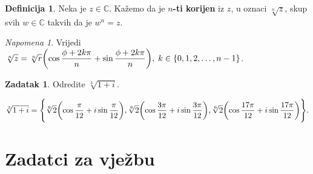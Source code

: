 \documentclass{book}
\let\originalleft\left
\let\originalright\right
\renewcommand{\left}{\mathopen{}\mathclose\bgroup\originalleft}
\renewcommand{\right}{\aftergroup\egroup\originalright}
\renewenvironment{proof}{%
    \vspace{-\parskip}\begin{oldproof}%
    }{%
    \end{oldproof}%
}
\theoremstyle{definition}
\theoremstyle{definition}
\newtheorem{definition}{Definicija}
\newtheorem{exercise}{Zadatak}
\theoremstyle{remark}
\newtheorem{remark}{Napomena}
\begin{document}
\begin{definition}
Neka je $z\in \mathbb{C}$. Kažemo da je \textbf{$n$-ti korijen} iz $z$, u oznaci $\sqrt[n]{z}$, skup svih $w\in \mathbb{C}$ takvih da je $w^n=z$.
\end{definition}

\begin{remark}
Vrijedi $\sqrt[n]{z}=\sqrt[n]{r}\left(\cos{\dfrac{\phi+2k\pi}{n}}+\sin{\dfrac{\phi+2k\pi}{n}}\right), \; k\in\{0, 1, 2, \dots, n-1\}$.
\end{remark}

\begin{exercise}
Odredite $\sqrt[3]{1+i}$.
\end{exercise}
\begin{proof}[Rješenje]
$$\sqrt[3]{1+i}=\left\{\sqrt[6]{2}\left(\cos{\dfrac{\pi}{12}}+i\sin{\dfrac{\pi}{12}}\right), \sqrt[6]{2}\left(\cos{\dfrac{3\pi}{12}}+i\sin{\dfrac{3\pi}{12}}\right), \sqrt[6]{2}\left(\cos{\dfrac{17\pi}{12}}+i\sin{\dfrac{17\pi}{12}}\right)\right\}.$$
\end{proof}
\newpage
\section*{Zadatci za vježbu}
\end{document}
